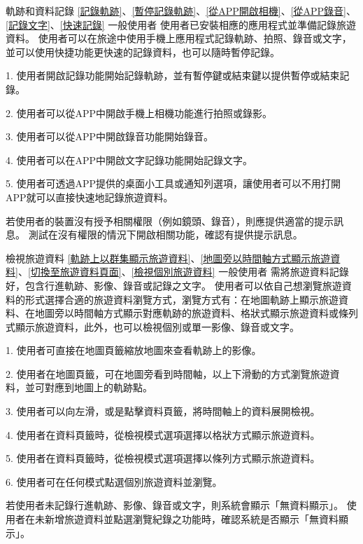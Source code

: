 \addUsecase
  {軌跡和資料記錄}
  {\ref{記錄軌跡}、\ref{暫停記錄軌跡}、\ref{從APP開啟相機}、\ref{從APP錄音}、\ref{記錄文字}、\ref{快速記錄}}
  {一般使用者}
  {使用者已安裝相應的應用程式並準備記錄旅遊資料。}
  {使用者可以在旅途中使用手機上應用程式記錄軌跡、拍照、錄音或文字，並可以使用快捷功能更快速的記錄資料，也可以隨時暫停記錄。}
  {
    1. 使用者開啟記錄功能開始記錄軌跡，並有暫停鍵或結束鍵以提供暫停或結束記錄。

    2. 使用者可以從APP中開啟手機上相機功能進行拍照或錄影。

    3. 使用者可以從APP中開啟錄音功能開始錄音。

    4. 使用者可以在APP中開啟文字記錄功能開始記錄文字。

    5. 使用者可透過APP提供的桌面小工具或通知列選項，讓使用者可以不用打開APP就可以直接快速地記錄旅遊資料。
  }
  {若使用者的裝置沒有授予相關權限（例如鏡頭、錄音），則應提供適當的提示訊息。}
  {測試在沒有權限的情況下開啟相關功能，確認有提供提示訊息。}

\addUsecase
  {檢視旅遊資料}
  {\ref{軌跡上以群集顯示旅遊資料}、\ref{地圖旁以時間軸方式顯示旅遊資料}、\ref{切換至旅遊資料頁面}、\ref{檢視個別旅遊資料}}
  {一般使用者}
  {需將旅遊資料記錄好，包含行進軌跡、影像、錄音或記錄之文字。}
  {使用者可以依自己想瀏覽旅遊資料的形式選擇合適的旅遊資料瀏覽方式，瀏覽方式有：在地圖軌跡上顯示旅遊資料、在地圖旁以時間軸方式顯示對應軌跡的旅遊資料、格狀式顯示旅遊資料或條列式顯示旅遊資料，此外，也可以檢視個別或單一影像、錄音或文字。}
  {
    1. 使用者可直接在地圖頁籤縮放地圖來查看軌跡上的影像。

    2. 使用者在地圖頁籤，可在地圖旁看到時間軸，以上下滑動的方式瀏覽旅遊資料，並可對應到地圖上的軌跡點。

    3. 使用者可以向左滑，或是點擊資料頁籤，將時間軸上的資料展開檢視。

    4. 使用者在資料頁籤時，從檢視模式選項選擇以格狀方式顯示旅遊資料。

    5. 使用者在資料頁籤時，從檢視模式選項選擇以條列方式顯示旅遊資料。

    6. 使用者可在任何模式點選個別旅遊資料並瀏覽。
  }
  {若使用者未記錄行進軌跡、影像、錄音或文字，則系統會顯示「無資料顯示」。}
  {使用者在未新增旅遊資料並點選瀏覽紀錄之功能時，確認系統是否顯示「無資料顯示」。}

